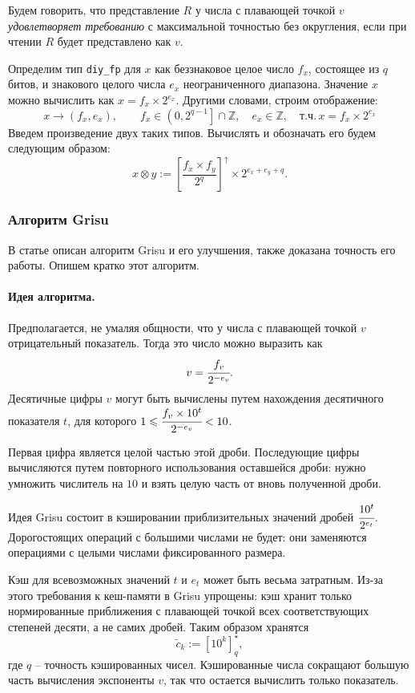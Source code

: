 Будем говорить, что представление $R$ у числа с плавающей точкой $v$ \textit{удовлетворяет требованию} с максимальной точностью без округления, если при чтении $R$ будет представлено как $v$.

Определим тип \texttt{diy\_fp} для $x$ как беззнаковое целое число $f_x$, состоящее из $q$ битов, и знакового целого числа $e_x$ неограниченного диапазона.
Значение $x$ можно вычислить как $x= f_x \times 2^{e_x}$. 
Другими словами, строим отображение:
$$x \to (f_x, e_x), \qquad f_x \in \left(0, 2^{q-1}\right] \cap \mathbb{Z}, \quad e_x \in \mathbb{Z},\quad \mbox{т.ч.}\, x=f_x \times 2^{e_x}$$
Введем произведение двух таких типов.
Вычислять и обозначать его будем следующим образом:
$$x \otimes y := \left[ \frac{f_x \times f_y}{2^q}\right]^\uparrow \times 2^{e_x+e_y+q}.$$
\subsubsection{Алгоритм \textsf{Grisu}}
В статье \cite{1} описан алгоритм \textsf{Grisu} и его улучшения, также доказана точность его работы.
Опишем кратко этот алгоритм.
\paragraph{Идея алгоритма.}
Предполагается, не умаляя общности, что у числа с плавающей точкой $v$ отрицательный показатель. 
Тогда это число можно выразить как $$v=\cfrac{f_v}{2^{-e_v}}.$$
Десятичные цифры $v$ могут быть вычислены путем нахождения десятичного показателя $t$, для которого $1 \leqslant \cfrac{f_v \times 10^t}{2^{-e_v}} < 10$.

Первая цифра является целой частью этой дроби. 
Последующие цифры вычисляются путем повторного использования оставшейся дроби: нужно умножить числитель на $10$ и взять целую часть от вновь полученной дроби.

Идея \textsf{Grisu} состоит в кэшировании приблизительных значений дробей $\cfrac{10^t}{2^{e_t}}$.
Дорогостоящих операций с большими числами не будет: они заменяются операциями с целыми числами фиксированного размера.

Кэш для всевозможных значений $t$ и $e_t$ может быть весьма затратным. 
Из-за этого требования к кеш-памяти в \textsf{Grisu} упрощены: кэш хранит только нормированные приближения с плавающей точкой всех соответствующих степеней десяти, а не самих дробей. Таким образом хранятся $$\tilde{c}_k := \left[ 10^k \right]_q^{\star},$$ где $q$ -- точность кэшированных чисел.
Кэшированные числа сокращают большую часть вычисления экспоненты $v$, так что остается вычислить только показатель. 

